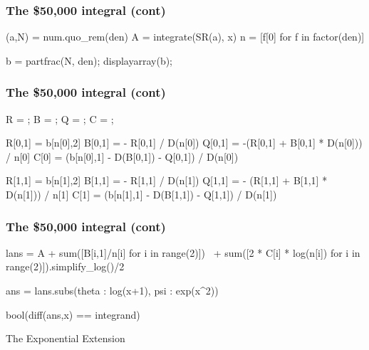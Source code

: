 \documentclass[aspectratio=169,dvipsnames]{beamer}
\begin{document}
\begin{frame}[fragile]
\frametitle{The \$50,000 integral (cont)}

\begin{sageblock}
(a,N) = num.quo_rem(den)
A = integrate(SR(a), x)
n = [f[0] for f in factor(den)]

b = partfrac(N, den);
displayarray(b);
\end{sageblock}

\end{frame}

\begin{frame}[fragile]
\frametitle{The \$50,000 integral (cont)}

\begin{sagecode}
R = {};
B = {};
Q = {};
C = {};
\end{sagecode}

\begin{sageblock}
R[0,1] = b[n[0],2]
B[0,1] = - R[0,1] / D(n[0])
Q[0,1] = -(R[0,1] + B[0,1] * D(n[0])) / n[0]
C[0] = (b[n[0],1] - D(B[0,1]) - Q[0,1]) / D(n[0])
\end{sageblock}

\begin{sageblock}
R[1,1] = b[n[1],2]
B[1,1] = - R[1,1] / D(n[1])
Q[1,1] = - (R[1,1] + B[1,1] * D(n[1])) / n[1]
C[1] = (b[n[1],1] - D(B[1,1]) - Q[1,1]) / D(n[1])
\end{sageblock}

\end{frame}

\begin{frame}[fragile]
\frametitle{The \$50,000 integral (cont)}

\begin{sageblock}
lans = A + sum([B[i,1]/n[i] for i in range(2)]) \
  + sum([2 * C[i] * log(n[i]) for i in range(2)]).simplify_log()/2
\end{sageblock}

\begin{sageblock}
ans = lans.subs({theta : log(x+1), psi : exp(x^2)})
\end{sageblock}

\begin{sageblock}
bool(diff(ans,x) == integrand)
\end{sageblock}

\end{frame}

\begin{frame}
\Huge
\centerline{The Exponential Extension}
\end{frame}
\end{document}
